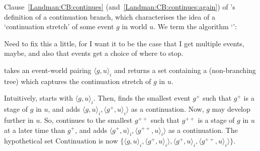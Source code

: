\begin{note}[\AlgAC{}]
  Clause~\ref{Landman:CB:continues} (and~\ref{Landman:CB:continues:again}) of \citeauthor{Landman:1992wh}'s definition of a continuation branch, which characterises the idea of a `continuation stretch' of some event \(g\) in world \(u\).
  We term the algorithm `\AlgAC{}':

  \begin{algorithm}[H]
    \label{PrAl:g-a-c}
    \caption{\AlgAC{}}
    \SetAlgoLined
    \DontPrintSemicolon
    {
      \color{red}
      Need to fix this a little, for I want it to be the case that I get multiple events, maybe, and also that events get a choice of where to stop.
    }
  \end{algorithm}

  \AlgAC{} takes an event-world pairing \(\langle g,u \rangle_{i}\) and returns a set containing a (non-branching tree) which captures the continuation stretch of \(g\) in \(u\).

  Intuitively, \AlgAC{} starts with \(\langle g,u \rangle_{i}\).
  Then, \AlgAC{} finds the smallest event \(g^{+}\) such that \(g^{+}\) is a stage of \(g\) in \(u\), and adds \(\langle g,u \rangle_{i}, \langle g^{+},u \rangle_{i} \rangle\) as a continuation.
  Now, \(g\) may develop further in \(u\).
  So, \AlgAC{} continues to the smallest \(g^{++}\) such that \(g^{++}\) is a stage of \(g\) in \(u\) at a later time than \(g^{+}\), and adds \(\langle g^{+},u \rangle_{i}, \langle g^{++},u \rangle_{i} \rangle\) as a continuation.
  The hypothetical set \(\text{Continuation}\) is now \(\{\langle g,u \rangle_{i}, \langle g^{+},u \rangle_{i} \rangle, \langle g^{+},u \rangle_{i}, \langle g^{++},u \rangle_{i} \rangle\}\).


\end{note}
